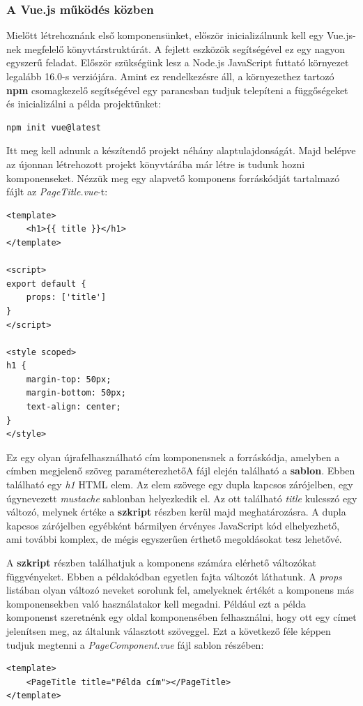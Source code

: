 \documentclass[12pt]{article}
\begin{document}
\subsubsection{A Vue.js működés közben}

Mielőtt létrehoznánk első komponensünket, először inicializálnunk kell egy Vue.js-nek megfelelő könyvtárstruktúrát. A fejlett eszközök segítségével ez egy nagyon egyszerű feladat. Először szükségünk lesz a Node.js JavaScript futtató környezet legalább 16.0-s verziójára. Amint ez rendelkezésre áll, a környezethez tartozó \textbf{npm} csomagkezelő segítségével egy parancsban tudjuk telepíteni a függőségeket és inicializálni a példa projektünket:
\begin{verbatim}
npm init vue@latest
\end{verbatim}

Itt meg kell adnunk a készítendő projekt néhány alaptulajdonságát. Majd belépve az újonnan létrehozott projekt könyvtárába már létre is tudunk hozni komponenseket.
Nézzük meg egy alapvető komponens forráskódját tartalmazó fájlt az \textit{PageTitle.vue}-t:
\begin{verbatim}
<template>
    <h1>{{ title }}</h1>
</template>

<script>
export default {
    props: ['title']
}
</script>

<style scoped>
h1 {
    margin-top: 50px;
    margin-bottom: 50px;
    text-align: center;
}
</style>
\end{verbatim}

Ez egy olyan újrafelhasználható cím komponensnek a forráskódja, amelyben a címben megjelenő szöveg paraméterezhetőA fájl elején található a \textbf{sablon}. Ebben található egy \textit{h1} HTML elem. Az elem szövege egy dupla kapcsos zárójelben, egy úgynevezett \textit{mustache} sablonban helyezkedik el. Az ott található \textit{title} kulcsszó egy változó, melynek értéke a \textbf{szkript} részben kerül majd meghatározásra. A dupla kapcsos zárójelben egyébként bármilyen érvényes JavaScript kód elhelyezhető, ami további komplex, de mégis egyszerűen érthető megoldásokat tesz lehetővé.

A \textbf{szkript} részben találhatjuk a komponens számára elérhető változókat függvényeket. Ebben a példakódban egyetlen fajta változót láthatunk. A \textit{props} listában olyan változó neveket sorolunk fel, amelyeknek értékét a komponens más komponensekben való használatakor kell megadni. Például ezt a példa komponenst szeretnénk egy oldal komponensében felhasználni, hogy ott egy címet jelenítsen meg, az általunk választott szöveggel. Ezt a következő féle képpen tudjuk megtenni a \textit{PageComponent.vue} fájl sablon részében:
\begin{verbatim}
<template>
    <PageTitle title="Példa cím"></PageTitle>
</template>
\end{verbatim}
\end{document}

